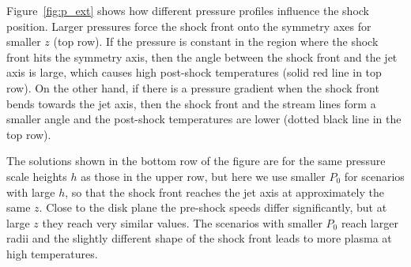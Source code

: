 Figure~\ref{fig:p_ext} shows how different pressure profiles influence the shock position. Larger pressures force the shock front onto the symmetry axes for smaller $z$ (top row). If the pressure is constant in the region where the shock front hits the symmetry axis, then the angle between the shock front and the jet axis is large, which causes high post-shock temperatures (solid red line in top row). On the other hand, if there is a pressure gradient when the shock front bends towards the jet axis, then the shock front and the stream lines form a smaller angle and the post-shock temperatures are lower (dotted black line in the top row).

The solutions shown in the bottom row of the figure are for the same pressure scale heights $h$ as those in the upper row, but here we use smaller $P_0$ for scenarios with large $h$, so that the shock front reaches the jet axis at approximately the same $z$. Close to the disk plane the pre-shock speeds differ significantly, but at large $z$ they reach very similar values. The scenarios with smaller $P_0$ reach larger radii and the slightly different shape of the shock front leads to more plasma at high temperatures.